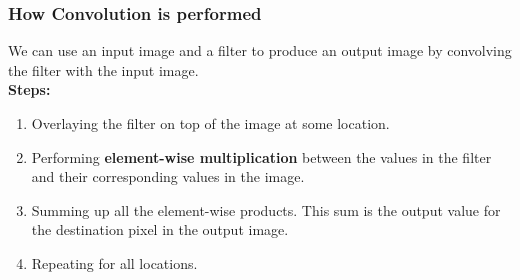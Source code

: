 \documentclass[aspectratio=169, 11pt]{beamer}
\begin{document}
\begin{frame}
	\frametitle{How Convolution is performed}
	We can use an input image and a filter to produce an output image by convolving the filter with the input image.\\
	\vspace{5pt}
	\textbf{Steps:}
	\begin{enumerate}
		\item Overlaying the filter on top of the image at some location.
		\item Performing \textbf{element-wise multiplication} between the values in the filter and their corresponding values in the image.
		\item Summing up all the element-wise products. This sum is the output value for the destination pixel in the output image.
		\item Repeating for all locations.
	\end{enumerate}




\end{frame}
\end{document}

